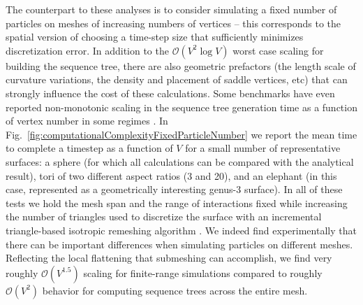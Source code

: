 \documentclass[preprint,12pt]{elsarticle}
\begin{document}
The counterpart to these  analyses is to consider simulating a fixed  number of particles on meshes of increasing numbers of vertices -- this corresponds to the spatial version of choosing a time-step size that sufficiently minimizes discretization error. In addition to the $\mathcal{O}(V^2 \log V)$ worst case scaling for building the sequence tree, there are also geometric prefactors (the length scale of curvature variations, the density and placement of saddle vertices, etc) that can strongly influence the cost of these calculations. Some benchmarks have even reported non-monotonic scaling in the sequence tree generation time as a function of vertex number in some regimes \cite{cgalklcdvtsmsp23b}. In Fig.~\ref{fig:computationalComplexityFixedParticleNumber}  we report the mean time to complete a timestep as a function of  $V$ for a small number of  representative surfaces: a sphere (for which all calculations  can be compared with the analytical result), tori of two different aspect ratios (3 and 20), and an elephant (in this case, represented as a geometrically interesting genus-3 surface). In all of these tests we hold the mesh span and the range of interactions fixed while 
increasing the number of triangles used to discretize the surface with an incremental triangle-based isotropic remeshing algorithm \cite{botsch2004remeshing}. We indeed find experimentally that there can be important differences when simulating particles on different meshes. Reflecting the local flattening that submeshing can accomplish, we find very roughly $\mathcal{O}(V^{1.5})$ scaling for finite-range simulations compared to roughly $\mathcal{O}(V^{2})$ behavior for computing sequence trees across the entire mesh.
\end{document}
